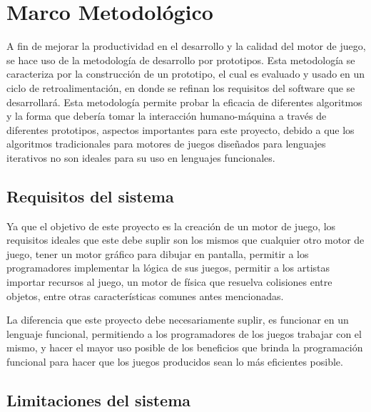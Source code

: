 
\chapter{Marco Metodológico}  %

\ifpdf
    \graphicspath{{metodologia/Figs/Raster/}{metodologia/Figs/PDF/}{metodologia/Figs/}}
\else
    \graphicspath{{metodologia/Figs/Vector/}{metodologia/Figs/}}
\fi

A fin de mejorar la productividad en el desarrollo y la calidad del motor de juego, se hace uso de la metodología de desarrollo por prototipos. Esta  metodología se caracteriza por la construcción de un prototipo, el cual es evaluado y usado en un ciclo de retroalimentación, en donde se refinan los requisitos del software que se desarrollará. Esta metodología permite probar la eficacia de diferentes algoritmos y la forma que debería tomar la interacción humano-máquina a través de diferentes prototipos, aspectos importantes para este proyecto, debido a que los algoritmos tradicionales para motores de juegos diseñados para lenguajes iterativos no son ideales para su uso en lenguajes funcionales.

\section{Requisitos del sistema}

Ya que el objetivo de este proyecto es la creación de un motor de juego, los requisitos ideales que este debe suplir son los mismos que cualquier otro motor de juego, tener un motor gráfico para dibujar en pantalla, permitir a los programadores implementar la lógica de sus juegos, permitir a los artistas importar recursos al juego, un motor de física que resuelva colisiones entre objetos, entre otras características comunes antes mencionadas.

La diferencia que este proyecto debe necesariamente suplir, es funcionar en un lenguaje funcional, permitiendo a los programadores de los juegos trabajar con el mismo, y hacer el mayor uso posible de los beneficios que brinda la programación funcional para hacer que los juegos producidos sean lo más eficientes posible.

\section{Limitaciones del sistema}

